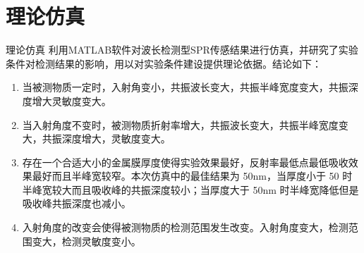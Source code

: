 \documentclass{beamer}
\begin{document}
\section{理论仿真}
\begin{frame}{理论仿真}
  利用MATLAB软件对波长检测型SPR传感结果进行仿真，并研究了实验条件对检测结果的影响，用以对实验条件建设提供理论依据。结论如下：
  \begin{enumerate}
    \item 当被测物质一定时，入射角变小，共振波长变大，共振半峰宽度变大，共振深度增大灵敏度变大。
    \item 当入射角度不变时，被测物质折射率增大，共振波长变大，共振半峰宽度变大，共振深度增大，灵敏度变大。
    \item 存在一个合适大小的金属膜厚度使得实验效果最好，反射率最低点最低吸收效果最好而且半峰宽较窄。本次仿真中的最佳结果为 50nm，当厚度小于 50 时半峰宽较大而且吸收峰的共振深度较小；当厚度大于 50nm 时半峰宽降低但是吸收峰共振深度也减小。
    \item 入射角度的改变会使得被测物质的检测范围发生改变。入射角度变大，检测范围变大，检测灵敏度变小。
  \end{enumerate}
  
\end{frame}
\end{document}
